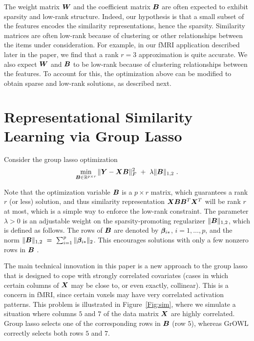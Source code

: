 The weight matrix $\boldsymbol{W}$ and the coefficient matrix $\boldsymbol{B}$ are often expected to
exhibit sparsity and low-rank structure. Indeed, our hypothesis is that a small
subset of the features encodes the similarity representations, hence the
sparsity. Similarity matrices are often low-rank because of clustering or other
relationships between the items under consideration. For example, in our fMRI
application described later in the paper, we find that a rank $r=3$
approximation is quite accurate. We also expect $\boldsymbol{W}$ and $\boldsymbol{B}$ to be low-rank
because of clustering relationships between the features. To account for this,
the optimization above can be modified to obtain sparse and low-rank solutions,
as described next.

\section{Representational Similarity Learning via Group Lasso}

Consider the group lasso optimization
\begin{equation}\label{eqn.grouplasso}
 \min_{\bB\in \R^{p\times r}} \|\bY-\bX\bB\|_F^2 \ + \ \lambda \|\bB\|_{1,2} \ .
\end{equation}

Note that the optimization variable $\boldsymbol{B}$ is a $p\times r$ matrix, which
guarantees a rank $r$ (or less) solution, and thus similarity representation
$\boldsymbol{X}\boldsymbol{B}\boldsymbol{B}^T\boldsymbol{X}^T$ will be rank $r$ at most, which is a simple way to enforce
the low-rank constraint. The parameter
$\lambda>0$ is an adjustable weight on the sparsity-promoting regularizer
$\|\boldsymbol{B}\|_{1,2}$, which is defined as follows. The rows of $\boldsymbol{B}$ are denoted by
$\boldsymbol{\beta}_{i{\ast}}$, $i=1,\dots,p$, and the norm
$\|\boldsymbol{B}\|_{1,2} \ = \ \sum_{i=1}^p \|\boldsymbol{\beta}_{i{\ast}}\|_2$.
This encourages solutions with only a few nonzero rows in $\boldsymbol{B}$
\citep{obo11,lounici,vandegeer}.

The main technical innovation in this paper is a new approach to the group lasso
that is designed to cope with strongly correlated covariates (\ie cases in which
certain columns of $\boldsymbol{X}$ may be close to, or even exactly, collinear). This is a
concern in fMRI, since certain voxels may have very correlated activation
patterns. This problem is illustrated in Figure~\ref{Fig:sim}, where we simulate
a situation where columns $5$ and $7$ of the data matrix $\boldsymbol{X}$ are highly
correlated. Group lasso selects one of the corresponding rows in $\boldsymbol{B}$ (row
$5$), whereas GrOWL correctly selects both rows $5$ and $7$.

